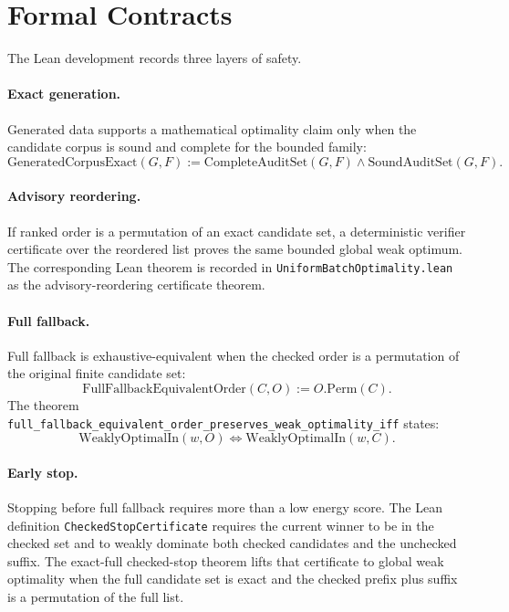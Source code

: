 \documentclass[11pt]{article}
\begin{document}
\section{Formal Contracts}

The Lean development records three layers of safety.

\paragraph{Exact generation.}
Generated data supports a mathematical optimality claim only when the candidate
corpus is sound and complete for the bounded family:
\[
  \mathrm{GeneratedCorpusExact}(G,F) :=
  \mathrm{CompleteAuditSet}(G,F) \wedge \mathrm{SoundAuditSet}(G,F).
\]

\paragraph{Advisory reordering.}
If ranked order is a permutation of an exact candidate set, a deterministic
verifier certificate over the reordered list proves the same bounded global
weak optimum. The corresponding Lean theorem is recorded in
\texttt{UniformBatchOptimality.lean} as the advisory-reordering certificate
theorem.

\paragraph{Full fallback.}
Full fallback is exhaustive-equivalent when the checked order is a permutation
of the original finite candidate set:
\[
  \mathrm{FullFallbackEquivalentOrder}(C,O) := O.\mathrm{Perm}(C).
\]
The theorem
\texttt{full\_fallback\_equivalent\_order\_preserves\_weak\_optimality\_iff}
states:
\[
  \mathrm{WeaklyOptimalIn}(w,O)
  \Longleftrightarrow
  \mathrm{WeaklyOptimalIn}(w,C).
\]

\paragraph{Early stop.}
Stopping before full fallback requires more than a low energy score. The Lean
definition \texttt{CheckedStopCertificate} requires the current winner to be in
the checked set and to weakly dominate both checked candidates and the
unchecked suffix. The exact-full checked-stop theorem lifts that certificate to
global weak optimality when the full candidate set is exact and the checked
prefix plus suffix is a permutation of the full list.
\end{document}
